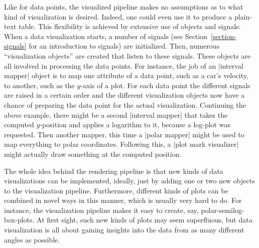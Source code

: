 Like for data points, the visualized pipeline makes no assumptions as
to what kind of visualization is desired. Indeed, one could even use
it to produce a plain-text table. This flexibility is achieved by
extensive use of objects and signals: When a data visualization
starts, a number of signals (see Section~\ref{section-signals} for an
introduction to signals) are initialized. Then, numerous
``visualization objects'' are created that listen to these
signals. These objects are all involved in processing the data
points. For instance, the job of an |interval mapper| object is to
map one attribute of a data point, such as a car's velocity, to
another, such as the $y$-axis of a plot. For each data point the
different signals are raised in a certain order and the different
visualization objects now have a chance of preparing the data point
for the actual visualization. Continuing the above example, there
might be a second |interval mapper| that takes the computed
$y$-position and applies a logarithm to it, because a log-plot was
requested. Then another mapper, this time a |polar mapper| might be
used to map everything to polar coordinates. Following this, a
|plot mark visualizer| might actually draw something at the computed
position.

The whole idea behind the rendering pipeline is that new kinds of data
visualizations can be implemented, ideally, just by adding one or two
new objects to the visualization pipeline. Furthermore, different
kinds of plots can be combined in novel ways in this manner, which is
usually very hard to do. For instance, the visualization pipeline
makes it easy to create, say, polar-semilog-box-plots. At first sight,
such new kinds of plots may seem superfluous, but data visualization
is all about gaining insights into the data from as many different
angles as possible.

